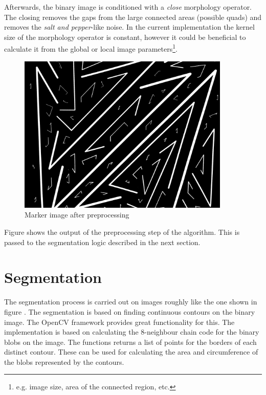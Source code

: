 Afterwards, the binary image is conditioned with a \emph{close} morphology operator.
The closing removes the gaps from the large connected areas (possible quads) and removes the \emph{salt and pepper}-like noise.
In the current implementation the kernel size of the morphology operator is constant, however it could be beneficial to calculate it from the global or local image parameters\footnote{e.g. image size, area of the connected region, etc.}.

\begin{figure}[ht]
	\centering
	\includegraphics[width=0.9\textwidth]{figures/marker_full_preprocessed.JPG}
	\caption{Marker image after preprocessing}
	\label{fig:markerFullPreproc}
\end{figure}
Figure  shows the output of the preprocessing step of the algorithm.
This is passed to the segmentation logic described in the next section.

\section{Segmentation}

The segmentation process is carried out on images roughly like the one shown in figure .
The segmentation is based on finding continuous contours on the binary image.
The OpenCV framework provides great functionality for this.
The implementation is based on calculating the 8-neighbour chain code for the binary blobs on the image.
The functions returns a list of points for the borders of each distinct contour.
These can be used for calculating the area and circumference of the blobs represented by the contours.

